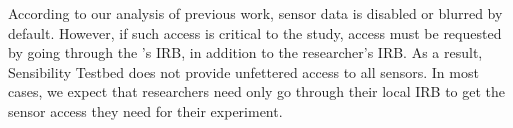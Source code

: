 According to our analysis of previous work, sensor data is disabled or 
blurred by default. However, if such access is critical to the study, access 
must be requested by going through the \sysname's IRB, in addition to the 
researcher's IRB. 
%
%
%
As a result, Sensibility Testbed does not
provide unfettered access to all sensors. 
In most cases, we expect
that researchers need only go through their local IRB to get
the sensor access they need for their experiment. 


